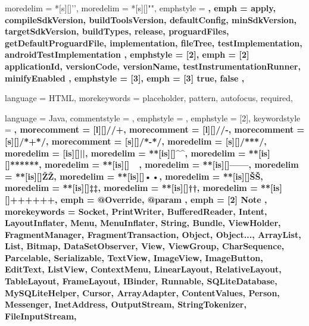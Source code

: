  {
	moredelim = *[s][\color{gray}]{'}{'},
	moredelim = *[s][\color{ForestGreen}]{"}{"},
	emphstyle = \bfseries,
	emph = {
		apply,
		compileSdkVersion,
		buildToolsVersion,
		defaultConfig,
		minSdkVersion,
		targetSdkVersion,
		buildTypes,
		release,
		proguardFiles,
		getDefaultProguardFile,
		implementation,
		fileTree, testImplementation,
		androidTestImplementation
	},
	emphstyle = {[2]\bfseries\color{violet}},
	emph = {[2]
		applicationId,
		versionCode,
		versionName,
		testInstrumentationRunner,
		minifyEnabled
	},
	emphstyle = {[3]\bfseries\color{orange}},
	emph = {[3]
		true,
		false
	},
}

 {
	language = HTML,
	morekeywords = {
		placeholder,
		pattern,
		autofocus,
		required,
	}
}

 {
	language = Java,
	commentstyle = \color{ashgrey},
	emphstyle = {\color{darkgray}},
	emphstyle = {[2]\bfseries},
	keywordstyle = \color{black}\bfseries,
	morecomment = [l][\color{blue}]{//+},		%
	morecomment = [l][\color{red}]{//-},		%
	morecomment = [s][\color{blue}]{/*+}{*/},	%
	morecomment = [s][\color{red}]{/*-}{*/},	%
	moredelim = [s][\color{ashgrey}]{/**}{*/},		%
	moredelim = [is][\soutthick]{|}{|},						%
	moredelim = **[is][\color{blue}]{^}{^},					%
	moredelim = **[is][\color{ForestGreen}]{***}{***},		%
	moredelim = **[is][\color{red}]{~}{~},					%
	moredelim = **[is][\btHL]{---}{---},					%
	moredelim = **[is][{\btHL[fill=blue!60]}]{Ž}{Ž},		%
	moredelim = **[is][{\btHL[fill=SkyBlue]}]{•}{•},		%
	moredelim = **[is][{\btHL[fill=orange!60]}]{Š}{Š},		%
	moredelim = **[is][{\btHL[fill=yellow!60]}]{‡}{‡},		%
	moredelim = **[is][{\btHL[fill=ForestGreen]}]{†}{†},	%
	moredelim = **[is][{\btHL[fill=green!30]}]{+++}{+++},	%
	emph = {
		@Override,
		@param
	},
	emph = {[2]
		Note
	},
	morekeywords = {
		Socket, PrintWriter, BufferedReader,
		Intent, LayoutInflater, Menu, MenuInflater, String, Bundle, ViewHolder,
		FragmentManager, FragmentTransaction,
		Object, Object...,
		ArrayList, List, Bitmap, DataSetObserver,
		View, ViewGroup,
		CharSequence, Parcelable, Serializable,
		TextView, ImageView,
		ImageButton, EditText, ListView, ContextMenu,
		LinearLayout, RelativeLayout, TableLayout, FrameLayout,
		IBinder, Runnable,
		SQLiteDatabase, MySQLiteHelper, Cursor, ArrayAdapter, ContentValues,
		Person, Messenger,
		InetAddress, OutputStream, StringTokenizer, FileInputStream,
	}
}

